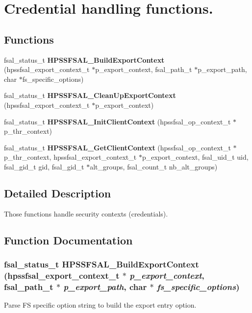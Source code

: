 \section{Credential handling functions.}
\label{group__FSALCredFunctions}
\subsection*{Functions}
\begin{DoxyCompactItemize}
\item 
fsal\_\-status\_\-t {\bf HPSSFSAL\_\-BuildExportContext} (hpssfsal\_\-export\_\-context\_\-t $\ast$p\_\-export\_\-context, fsal\_\-path\_\-t $\ast$p\_\-export\_\-path, char $\ast$fs\_\-specific\_\-options)
\item 
fsal\_\-status\_\-t {\bf HPSSFSAL\_\-CleanUpExportContext} (hpssfsal\_\-export\_\-context\_\-t $\ast$p\_\-export\_\-context)
\item 
fsal\_\-status\_\-t {\bfseries HPSSFSAL\_\-InitClientContext} (hpssfsal\_\-op\_\-context\_\-t $\ast$p\_\-thr\_\-context)\label{group__FSALCredFunctions_gaf3f7f69fa737017b38468f7fe8857771}

\item 
fsal\_\-status\_\-t {\bf HPSSFSAL\_\-GetClientContext} (hpssfsal\_\-op\_\-context\_\-t $\ast$p\_\-thr\_\-context, hpssfsal\_\-export\_\-context\_\-t $\ast$p\_\-export\_\-context, fsal\_\-uid\_\-t uid, fsal\_\-gid\_\-t gid, fsal\_\-gid\_\-t $\ast$alt\_\-groups, fsal\_\-count\_\-t nb\_\-alt\_\-groups)
\end{DoxyCompactItemize}


\subsection{Detailed Description}
Those functions handle security contexts (credentials). 

\subsection{Function Documentation}
\subsubsection[{HPSSFSAL\_\-BuildExportContext}]{\setlength{\rightskip}{0pt plus 5cm}fsal\_\-status\_\-t HPSSFSAL\_\-BuildExportContext (hpssfsal\_\-export\_\-context\_\-t $\ast$ {\em p\_\-export\_\-context}, \/  fsal\_\-path\_\-t $\ast$ {\em p\_\-export\_\-path}, \/  char $\ast$ {\em fs\_\-specific\_\-options})}\label{group__FSALCredFunctions_gab7ad41d6e55f9b1c4b12a5a452ff0826}
Parse FS specific option string to build the export entry option. 

